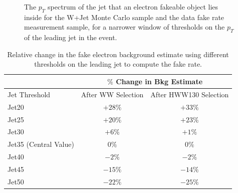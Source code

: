 \begin{figure}[!htbp]
\begin{center}
\caption{The $p_{T}$ spectrum of the jet that an electron fakeable object lies inside for the 
W+Jet Monte Carlo sample and the data fake rate measurement sample, for a narrower window of thresholds
on the $p_{T}$ of the leading jet in the event.}
\label{fig:ele_fr_jetspectrumNarrowerWindow}
\end{center}
\end{figure}


\begin{table}[!htbp]
\begin{center}
\begin{tabular}{|l|c|c|}
\hline
                        & \multicolumn{2}{|c|}{ $\%$ Change in Bkg Estimate} \\
\hline
Jet Threshold           & After WW Selection  & After HWW130 Selection \\
\hline
Jet20                   &  $+28\%$     & $+33\%$    \\
Jet25                   &  $+20\%$     & $+23\%$    \\
Jet30                   &  $+6\%$      & $+1\%$     \\
Jet35 (Central Value)   &  $0\%$       & $0\%$      \\
Jet40                   &  $-2\%$      & $-2\%$     \\
Jet45                   &  $-15\%$     & $-14\%$    \\
Jet50                   &  $-22\%$     & $-25\%$    \\
\hline

\hline
\end{tabular}
\caption{Relative change in the fake electron background estimate using different thresholds on the leading jet to compute the fake rate. }
\label{tab:ele_fr_JetSpectrumSystematics}
\end{center}
\end{table}




